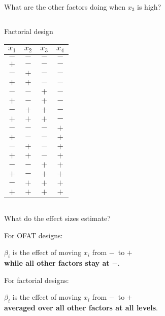 \documentclass[10pt]{beamer}
\newcommand\lo{\ensuremath{\boldsymbol{-}}}
\newcommand\hi{\ensuremath{\boldsymbol{+}}}
\begin{document}
\begin{frame}{What are the other factors doing when \(x_3\) is high?}
\begin{columns}
\begin{column}{0.45\textwidth}
\begin{center}
Factorial design
\begin{tabular}{cccc}
$x_1$ & $x_2$ & $x_3$ & $x_4$ \\
\hline
\lo & \lo & \lo & \lo \\
\hi & \lo & \lo & \lo \\
\lo & \hi & \lo & \lo \\
\hi & \hi & \lo & \lo \\
\rowcolor{pink} \lo & \lo & \hi & \lo \\
\rowcolor{pink} \hi & \lo & \hi & \lo \\
\rowcolor{pink} \lo & \hi & \hi & \lo \\
\rowcolor{pink} \hi & \hi & \hi & \lo \\
\lo & \lo & \lo & \hi \\
\hi & \lo & \lo & \hi \\
\lo & \hi & \lo & \hi \\
\hi & \hi & \lo & \hi \\
\rowcolor{pink} \lo & \lo & \hi & \hi \\
\rowcolor{pink} \hi & \lo & \hi & \hi \\
\rowcolor{pink} \lo & \hi & \hi & \hi \\
\rowcolor{pink} \hi & \hi & \hi & \hi \\
\end{tabular}
\end{center}
\end{column}

\end{columns}
\end{frame}

\begin{frame}{What do the effect sizes estimate?}

For OFAT designs:
\begin{center}
	 $\beta_i$ is the effect of moving $x_i$ from \lo\ to \hi\ \\ \textbf{while all other factors stay at \lo}.
\end{center}

\pause
\bigskip
For factorial designs:
\begin{center}
	 $\beta_i$ is the effect of moving $x_i$ from \lo\ to \hi\ \\ \textbf{averaged over all other factors at all levels}.
\end{center}
	
\end{frame}
\end{document}
